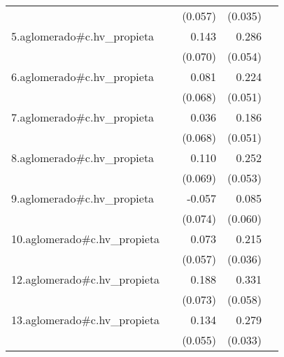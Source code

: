 {\begin{longtable}{l*{4}{D{.}{.}{-1}}}
            &                     &     (0.057)         &     (0.035)         &                     \\
\addlinespace
5.aglomerado#c.hv\_propieta&                     &       0.143\sym{*}  &       0.286\sym{***}&                     \\
            &                     &     (0.070)         &     (0.054)         &                     \\
\addlinespace
6.aglomerado#c.hv\_propieta&                     &       0.081         &       0.224\sym{***}&                     \\
            &                     &     (0.068)         &     (0.051)         &                     \\
\addlinespace
7.aglomerado#c.hv\_propieta&                     &       0.036         &       0.186\sym{***}&                     \\
            &                     &     (0.068)         &     (0.051)         &                     \\
\addlinespace
8.aglomerado#c.hv\_propieta&                     &       0.110         &       0.252\sym{***}&                     \\
            &                     &     (0.069)         &     (0.053)         &                     \\
\addlinespace
9.aglomerado#c.hv\_propieta&                     &      -0.057         &       0.085         &                     \\
            &                     &     (0.074)         &     (0.060)         &                     \\
\addlinespace
10.aglomerado#c.hv\_propieta&                     &       0.073         &       0.215\sym{***}&                     \\
            &                     &     (0.057)         &     (0.036)         &                     \\
\addlinespace
12.aglomerado#c.hv\_propieta&                     &       0.188\sym{*}  &       0.331\sym{***}&                     \\
            &                     &     (0.073)         &     (0.058)         &                     \\
\addlinespace
13.aglomerado#c.hv\_propieta&                     &       0.134\sym{*}  &       0.279\sym{***}&                     \\
            &                     &     (0.055)         &     (0.033)         &                     \\

\end{longtable}}
